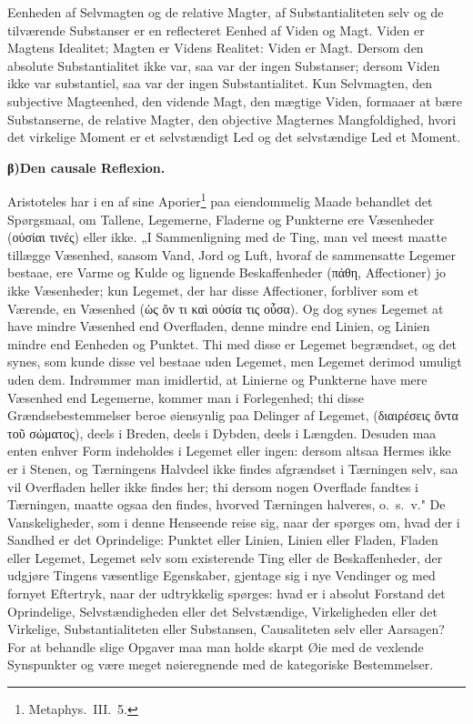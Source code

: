 \documentclass[12pt]{book}
\newcommand{\opage}[1]{\marginnote{\footnotesize\textit{[#1]}}}
\begin{document}
Eenheden af Selvmagten og de relative Magter, af Substantialiteten selv og de tilværende
Substanser er en reflecteret Eenhed af Viden og Magt. Viden er Magtens Idealitet; Magten
er Videns Realitet: Viden er Magt. Dersom den absolute Substantialitet ikke var, saa var
der ingen Substanser; dersom Viden ikke var substantiel, saa var der ingen
Substantialitet. Kun Selvmagten, den subjective Magteenhed, den vidende Magt, den
mægtige Viden, formaaer at bære Substanserne, de relative Magter, den objective
Magternes Mangfoldighed, hvori det virkelige Moment er et selvstændigt Led og det
selvstændige Led et Moment.

\opage{114} \begin{center}{\bfseries β)\quad Den causale Reflexion.}\end{center}

Aristoteles har i en af sine Aporier\footnote{Metaphys.\ III.\ 5.} paa eiendommelig
Maade behandlet det Spørgsmaal, om Tallene, Legemerne, Fladerne og Punkterne ere
Væsenheder (οὐσίαι τινές) eller ikke. „I Sammenligning med de Ting, man vel meest maatte
tillægge Væsenhed, saasom Vand, Jord og Luft, hvoraf de sammensatte Legemer bestaae, ere
Varme og Kulde og lignende Beskaffenheder (πάθη, Affectioner) jo ikke Væsenheder; kun
Legemet, der har disse Affectioner, forbliver som et Værende, en Væsenhed (ὡς ὄν τι καὶ
οὐσία τις οὖσα). Og dog synes Legemet at have mindre Væsenhed end Overfladen, denne
mindre end Linien, og Linien mindre end Eenheden og Punktet. Thi med disse er Legemet
begrændset, og det synes, som kunde disse vel bestaae uden Legemet, men Legemet derimod
umuligt uden dem. Indrømmer man imidlertid, at Linierne og Punkterne have mere Væsenhed
end Legemerne, kommer man i Forlegenhed; thi disse Grændsebestemmelser beroe øiensynlig
paa Delinger af Legemet, (διαιρέσεις ὄντα τοῦ σώματος), deels i Breden, deels i Dybden,
deels i Længden. Desuden maa enten enhver Form indeholdes i Legemet eller ingen: dersom
altsaa Hermes ikke er i Stenen, og Tærningens Halvdeel ikke findes afgrændset i
Tærningen selv, saa vil Overfladen heller ikke findes her; thi dersom nogen Overflade
fandtes i Tærningen, maatte ogsaa den findes, hvorved Tærningen halveres, o.\ s.\ v." De
Vanskeligheder, som i denne Henseende reise sig, naar der spørges om, hvad der i Sandhed
er det Oprindelige: Punktet eller Linien, Linien eller Fladen, Fladen eller Legemet,
Legemet selv som existerende Ting eller de Beskaffenheder, der udgjøre Tingens væsentlige
Egenskaber, gjentage sig i nye Vendinger og med fornyet Eftertryk, naar der udtrykkelig
\opage{115} spørges: hvad er i absolut Forstand det Oprindelige, Selvstændigheden eller det
Selvstændige, Virkeligheden eller det Virkelige, Substantialiteten eller Substansen,
Causaliteten selv eller Aarsagen? For at behandle slige Opgaver maa man holde skarpt Øie
med de vexlende Synspunkter og være meget nøieregnende med de kategoriske Bestemmelser.
\end{document}
